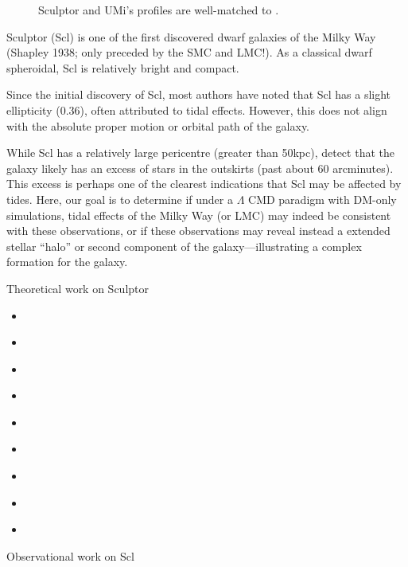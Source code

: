 \begin{figure}
\centering
{}
\caption[Idealized simulations match Scl and UMi]{Sculptor and UMi's
profiles are well-matched to \citet{PNM2008}.}\label{fig:toy_profiles}
\end{figure}

Sculptor (Scl) is one of the first discovered dwarf galaxies of the
Milky Way (Shapley 1938; only preceded by the SMC and LMC!). As a
classical dwarf spheroidal, Scl is relatively bright and compact.

Since the initial discovery of Scl, most authors have noted that Scl has
a slight ellipticity (\(0.36\)), often attributed to tidal effects.
However, this does not align with the absolute proper motion or orbital
path of the galaxy.

While Scl has a relatively large pericentre (greater than 50kpc),
\citet{sestito+2023a} detect that the galaxy likely has an excess of
stars in the outskirts (past about 60 arcminutes). This excess is
perhaps one of the clearest indications that Scl may be affected by
tides. Here, our goal is to determine if under a \(\Lambda\) CMD
paradigm with DM-only simulations, tidal effects of the Milky Way (or
LMC) may indeed be consistent with these observations, or if these
observations may reveal instead a extended stellar ``halo'' or second
component of the galaxy---illustrating a complex formation for the
galaxy.

Theoretical work on Sculptor

\begin{itemize}
\tightlist
\item
  \citet{battaglia+2008}
\item
  \citet{iorio+2019}
\item
  \citet{amorisco+zavala+deboer2014}
\item
  \citet{battaglia+2008}
\item
  \citet{breddels+2013}
\item
  \citet{breddels+helmi2013}
\item
  \citet{richardson+fairbairn2014}
\item
  \citet{SFW2017}
\item
  \citet{innanen+papp1979}
\end{itemize}

Observational work on Scl

